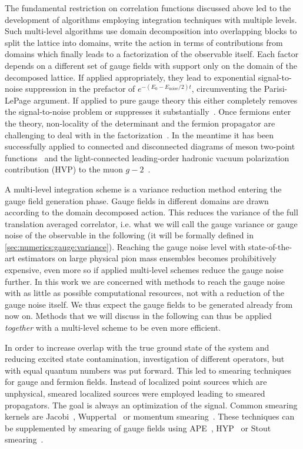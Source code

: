 The fundamental restriction on correlation functions discussed above led to the development of algorithms employing integration techniques with multiple levels.
Such multi-level algorithms use domain decomposition into overlapping blocks to split the lattice into domains, write the action in terms of contributions from domains which finally leads to a factorization of the observable itself.
Each factor depends on a different set of gauge fields with support only on the domain of the decomposed lattice.
If applied appropriately, they lead to exponential signal-to-noise suppression in the prefactor of $e^{-(E_0 - E_{\text{noise}}/2)t}$, circumventing the Parisi-LePage argument.
If applied to pure gauge theory this either completely removes the signal-to-noise problem or suppresses it substantially~\cite{Luscher:2001up,Meyer:2002cd,DellaMorte:2007zz,DellaMorte:2008jd,della2011novel}.
Once fermions enter the theory, non-locality of the determinant and the fermion propagator are challenging to deal with in the factorization~\cite{Ce:2016idq,Ce:2016ajy,Giusti:2017ksp,Ce:2017ndt}.
In the meantime it has been successfully applied to connected and disconnected diagrams of meson two-point functions~\cite{Giusti:2018vxm} and the light-connected leading-order hadronic vacuum polarization contribution (HVP) to the muon $g-2$~\cite{DallaBrida:2020cik,Giusti:2021qhk}.

A multi-level integration scheme is a variance reduction method entering the gauge field generation phase.
Gauge fields in different domains are drawn according to the domain decomposed action.
This reduces the variance of the full translation averaged correlator, i.e. what we will call the gauge variance or gauge noise of the observable in the following (it will be formally defined in \cref{sec:numerics:gauge:variance}).
Reaching the gauge noise level with state-of-the-art estimators on large physical pion mass ensembles becomes prohibitively expensive, even more so if applied multi-level schemes reduce the gauge noise further.
In this work we are concerned with methods to reach the gauge noise with as little as possible computational resources, not with a reduction of the gauge noise itself.
We thus expect the gauge fields to be generated already from now on.
Methods that we will discuss in the following can thus be applied \emph{together} with a multi-level scheme to be even more efficient. 

In order to increase overlap with the true ground state of the system and reducing excited state contamination, investigation of different operators, but with equal quantum numbers was put forward.
This led to smearing techniques for gauge and fermion fields.
Instead of localized point sources which are unphysical, smeared localized sources were employed leading to smeared propagators.
The goal is always an optimization of the signal.
Common smearing kernels are Jacobi~\cite{GUSKEN1989,PhysRevD.56.2743,Collins:1992fj,UKQCD:1993gym}, Wuppertal~\cite{GUSKEN1990361} or momentum smearing~\cite{Bali:2016lva}.
These techniques can be supplemented by smearing of gauge fields using APE~\cite{ALBANESE1987163}, HYP~\cite{Hasenfratz:2001hp} or Stout smearing~\cite{PhysRevD.69.054501}.

